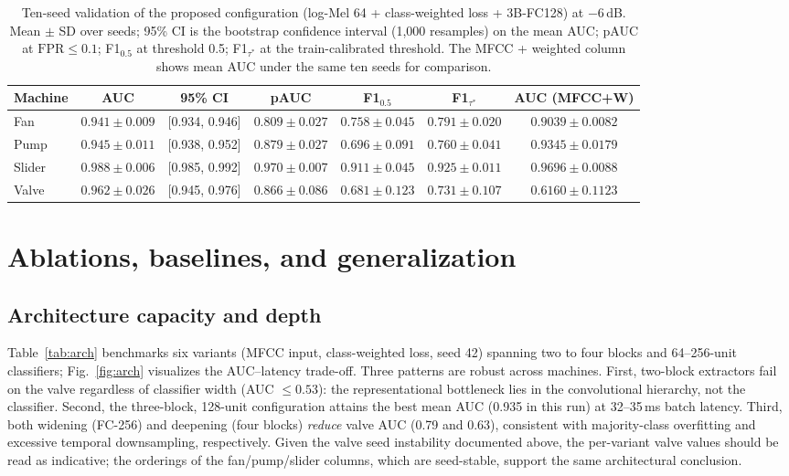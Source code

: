 \documentclass[review,nopreprintline]{elsarticle}
\newcommand{\msFanAuc}{0.941}    \newcommand{\msFanAucSd}{0.009}    \newcommand{\msFanAucCI}{[0.934, 0.946]}
\newcommand{\msPumpAuc}{0.945}   \newcommand{\msPumpAucSd}{0.011}   \newcommand{\msPumpAucCI}{[0.938, 0.952]}
\newcommand{\msSliderAuc}{0.988} \newcommand{\msSliderAucSd}{0.006} \newcommand{\msSliderAucCI}{[0.985, 0.992]}
\newcommand{\msValveAuc}{0.962}  \newcommand{\msValveAucSd}{0.026}  \newcommand{\msValveAucCI}{[0.945, 0.976]}
\newcommand{\msFanPauc}{$0.809 \pm 0.027$}   \newcommand{\msPumpPauc}{$0.879 \pm 0.027$}
\newcommand{\msSliderPauc}{$0.970 \pm 0.007$}\newcommand{\msValvePauc}{$0.866 \pm 0.086$}
\newcommand{\msFanFone}{$0.758 \pm 0.045$}   \newcommand{\msPumpFone}{$0.696 \pm 0.091$}
\newcommand{\msSliderFone}{$0.911 \pm 0.045$}\newcommand{\msValveFone}{$0.681 \pm 0.123$}
\newcommand{\msFanFcal}{$0.791 \pm 0.020$}   \newcommand{\msPumpFcal}{$0.760 \pm 0.041$}
\newcommand{\msSliderFcal}{$0.925 \pm 0.011$}\newcommand{\msValveFcal}{$0.731 \pm 0.107$}
\begin{document}
\begin{table}[t]
\centering
\caption{Ten-seed validation of the proposed configuration (log-Mel 64 + class-weighted loss + 3B-FC128) at $-6$\,dB. Mean $\pm$ SD over seeds; 95\% CI is the bootstrap confidence interval (1{,}000 resamples) on the mean AUC; pAUC at $\mathrm{FPR}\le0.1$; F1$_{0.5}$ at threshold 0.5; F1$_{\tau^\ast}$ at the train-calibrated threshold. The MFCC + weighted column shows mean AUC under the same ten seeds for comparison.}
\label{tab:multiseed}
\small
\setlength{\tabcolsep}{4pt}
\begin{tabular}{lcccccc}
\toprule
Machine & AUC & 95\% CI & pAUC & F1$_{0.5}$ & F1$_{\tau^\ast}$ & AUC (MFCC+W) \\
\midrule
Fan    & $\msFanAuc \pm \msFanAucSd$ & \msFanAucCI & \msFanPauc & \msFanFone & \msFanFcal & $0.9039 \pm 0.0082$ \\
Pump   & $\msPumpAuc \pm \msPumpAucSd$ & \msPumpAucCI & \msPumpPauc & \msPumpFone & \msPumpFcal & $0.9345 \pm 0.0179$ \\
Slider & $\msSliderAuc \pm \msSliderAucSd$ & \msSliderAucCI & \msSliderPauc & \msSliderFone & \msSliderFcal & $0.9696 \pm 0.0088$ \\
Valve  & $\msValveAuc \pm \msValveAucSd$ & \msValveAucCI & \msValvePauc & \msValveFone & \msValveFcal & $0.6160 \pm 0.1123$ \\
\bottomrule
\end{tabular}
\end{table}

\section{Ablations, baselines, and generalization}
\label{sec:ablation}

\subsection{Architecture capacity and depth}
\label{sec:arch}

Table~\ref{tab:arch} benchmarks six variants (MFCC input, class-weighted loss, seed 42) spanning two to four blocks and 64--256-unit classifiers; Fig.~\ref{fig:arch} visualizes the AUC--latency trade-off. Three patterns are robust across machines. First, two-block extractors fail on the valve regardless of classifier width (AUC $\le0.53$): the representational bottleneck lies in the convolutional hierarchy, not the classifier. Second, the three-block, 128-unit configuration attains the best mean AUC (0.935 in this run) at 32--35\,ms batch latency. Third, both widening (FC-256) and deepening (four blocks) \emph{reduce} valve AUC (0.79 and 0.63), consistent with majority-class overfitting and excessive temporal downsampling, respectively. Given the valve seed instability documented above, the per-variant valve values should be read as indicative; the orderings of the fan/pump/slider columns, which are seed-stable, support the same architectural conclusion.
\end{document}
